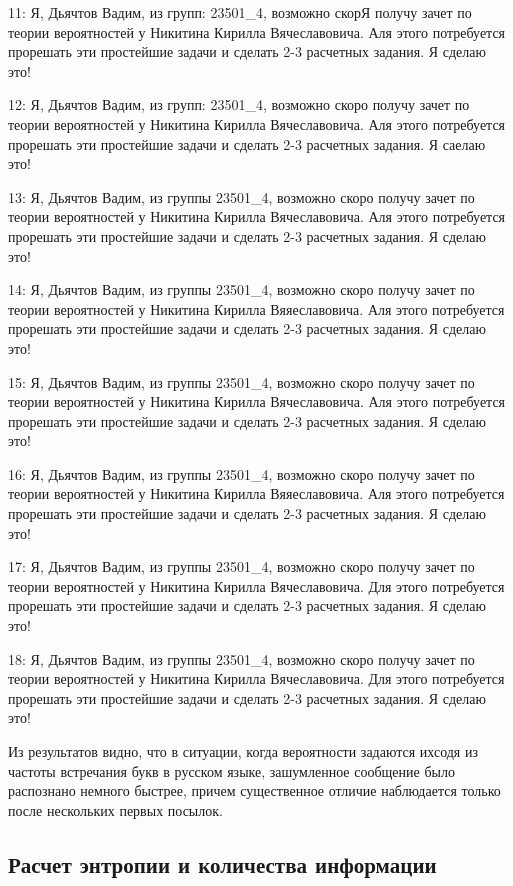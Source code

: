 {11: Я, Дьячтов Вадим, из групп: 23501\_4, возможно скорЯ получу зачет по теории вероятностей у Никитина Кирилла Вячеславовича. Аля этого потребуется прорешать эти простейшие задачи и сделать 2-3 расчетных задания. Я сделаю это!

12: Я, Дьячтов Вадим, из групп: 23501\_4, возможно скоро получу зачет по теории вероятностей у Никитина Кирилла Вячеславовича. Аля этого потребуется прорешать эти простейшие задачи и сделать 2-3 расчетных задания. Я саелаю это!

13: Я, Дьячтов Вадим, из группы 23501\_4, возможно скоро получу зачет по теории вероятностей у Никитина Кирилла Вячеславовича. Аля этого потребуется прорешать эти простейшие задачи и сделать 2-3 расчетных задания. Я сделаю это!

14: Я, Дьячтов Вадим, из группы 23501\_4, возможно скоро получу зачет по теории вероятностей у Никитина Кирилла Вяяеславовича. Аля этого потребуется прорешать эти простейшие задачи и сделать 2-3 расчетных задания. Я сделаю это!

15: Я, Дьячтов Вадим, из группы 23501\_4, возможно скоро получу зачет по теории вероятностей у Никитина Кирилла Вячеславовича. Аля этого потребуется прорешать эти простейшие задачи и сделать 2-3 расчетных задания. Я сделаю это!

16: Я, Дьячтов Вадим, из группы 23501\_4, возможно скоро получу зачет по теории вероятностей у Никитина Кирилла Вяяеславовича. Аля этого потребуется прорешать эти простейшие задачи и сделать 2-3 расчетных задания. Я сделаю это!

17: Я, Дьячтов Вадим, из группы 23501\_4, возможно скоро получу зачет по теории вероятностей у Никитина Кирилла Вячеславовича. Для этого потребуется прорешать эти простейшие задачи и сделать 2-3 расчетных задания. Я сделаю это!

18: Я, Дьячтов Вадим, из группы 23501\_4, возможно скоро получу зачет по теории вероятностей у Никитина Кирилла Вячеславовича. Для этого потребуется прорешать эти простейшие задачи и сделать 2-3 расчетных задания. Я сделаю это!

}
\vspace{0.5cm}

Из результатов видно, что в ситуации, когда вероятности задаются ихсодя из частоты встречания букв в русском языке, зашумленное сообщение было распознано немного быстрее, причем существенное отличие наблюдается только после нескольких первых посылок.

\subsection{Расчет энтропии и количества информации}

